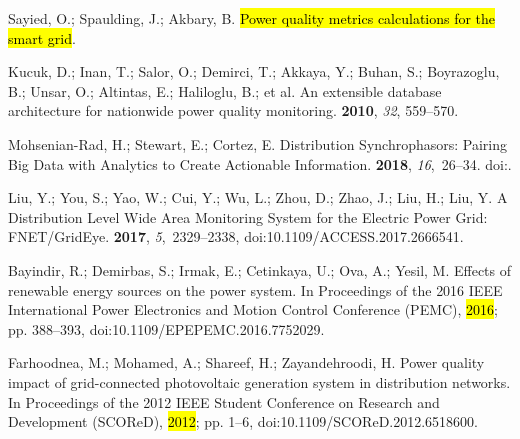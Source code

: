\documentclass[energies,article,accept,moreauthors,pdftex]{Definitions/mdpi}
\begin{document}
\begin{thebibliography}{999}
Sayied, O.; Spaulding, J.; Akbary, B.
\newblock \hl{Power quality metrics calculations for the smart grid}. %

Kucuk, D.; Inan, T.; Salor, O.; Demirci, T.; Akkaya, Y.; Buhan, S.; Boyrazoglu,
B.; Unsar, O.; Altintas, E.; Haliloglu, B.; et al.
\newblock An extensible database architecture for nationwide power quality
monitoring.
 {\bf 2010}, {\em 32},  559--570. 

Mohsenian-Rad, H.; Stewart, E.; Cortez, E.
\newblock Distribution {Synchrophasors}: {Pairing} {Big} {Data} with
{Analytics} to {Create} {Actionable} {Information}.
 {\bf 2018}, {\em 16},~26--34.
\newblock
doi:{\href{https://doi.org/10.1109/MPE.2018.2790818}{}}.

Liu, Y.; You, S.; Yao, W.; Cui, Y.; Wu, L.; Zhou, D.; Zhao, J.; Liu, H.; Liu,
Y.
\newblock A {Distribution} {Level} {Wide} {Area} {Monitoring} {System} for the
{Electric} {Power} {Grid}: {FNET}/{GridEye}.
 {\bf 2017}, {\em 5},~2329--2338, doi:10.1109/ACCESS.2017.2666541.

Bayindir, R.; Demirbas, S.; Irmak, E.; Cetinkaya, U.; Ova, A.; Yesil, M.
\newblock Effects of renewable energy sources on the power system.
\newblock In {Proceedings of the } 2016 {IEEE} {International} {Power} {Electronics} and {Motion}
{Control} {Conference} ({PEMC}), \hl{2016}; pp. 388--393, doi:10.1109/EPEPEMC.2016.7752029.

Farhoodnea, M.; Mohamed, A.; Shareef, H.; Zayandehroodi, H.
\newblock Power quality impact of grid-connected photovoltaic generation system
in distribution networks.
\newblock In {Proceedings of the } 2012 {IEEE} {Student} {Conference} on {Research} and {Development}
({SCOReD}), \hl{2012}; pp. 1--6, doi:10.1109/SCOReD.2012.6518600.


\end{thebibliography}
\end{document}
